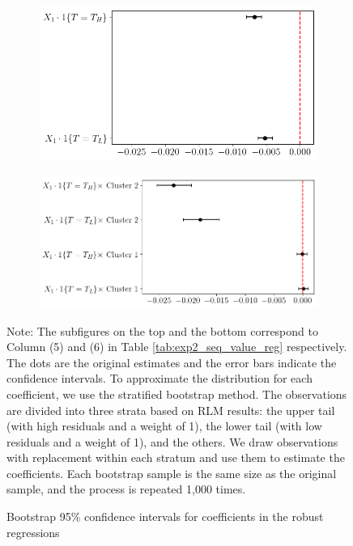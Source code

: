\begin{figure} 
\centering
\begin{subfigure}{0.85\textwidth}
  \hfill
  \includegraphics[width=0.85\linewidth]{figures/exp2_bootstrap_ci_baseline.png}
\end{subfigure}
\begin{subfigure}{0.85\textwidth} 
  \hfill
  \includegraphics[width=\linewidth]{figures/exp2_bootstrap_ci_label.png} 
\end{subfigure}
\caption{Bootstrap 95\% confidence intervals for coefficients in the robust regressions}
\vspace*{4pt}
\centering

\begin{minipage}{1.0\textwidth}
{\par\footnotesize Note: The subfigures on the top and the bottom correspond to Column (5) and (6) in Table \ref{tab:exp2_seq_value_reg} respectively. The dots are the original estimates and the error bars indicate the confidence intervals. To approximate the distribution for each coefficient, we use the stratified bootstrap method. The observations are divided into three strata based on RLM results: the upper tail (with high residuals and a weight of 1), the lower tail (with low residuals and a weight of 1), and the others. We draw observations with replacement within each stratum and use them to estimate the coefficients. Each bootstrap sample is the same size as the original sample, and the process is repeated 1,000 times. }
\end{minipage}
\label{fig:exp2_bootstrap_ci}
\end{figure}

